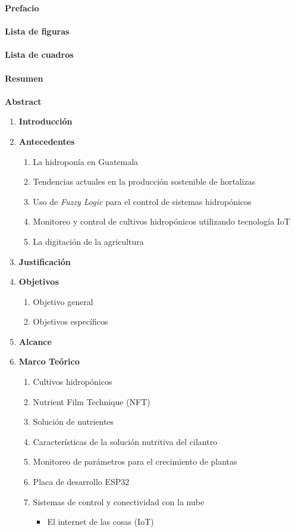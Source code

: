 \noindent \textbf{Prefacio} \\
\\
\textbf{Lista de figuras} \\
\\
\textbf{Lista de cuadros} \\
\\
\textbf{Resumen} \\
\\
\textbf{Abstract}

\begin{enumerate}
	\item \textbf{Introducción}
	\item \textbf{Antecedentes}
	\begin{enumerate}
		\item La hidroponía en Guatemala
		\item Tendencias actuales en la producción sostenible de hortalizas
		\item Uso de \textit{Fuzzy Logic} para el control de sistemas hidropónicos
		\item Monitoreo y control de cultivos hidropónicos utilizando tecnología IoT
		\item La digitación de la agricultura
	\end{enumerate}
	\item \textbf{Justificación}
	\item \textbf{Objetivos}
	\begin{enumerate}
		\item Objetivo general
		\item Objetivos específicos
	\end{enumerate}
	\item \textbf{Alcance}
	\item \textbf{Marco Teórico}
	\begin{enumerate}
		\item Cultivos hidropónicos
		\item Nutrient Film Technique (NFT)
		\item Solución de nutrientes
		\item Características de la solución nutritiva del cilantro
		\item Monitoreo de parámetros para el crecimiento de plantas
		\item Placa de desarrollo ESP32
		\item Sistemas de control y conectividad con la nube
		\begin{itemize}
			\item El internet de las cosas (IoT)

\end{itemize}
\end{enumerate}
\end{enumerate}
